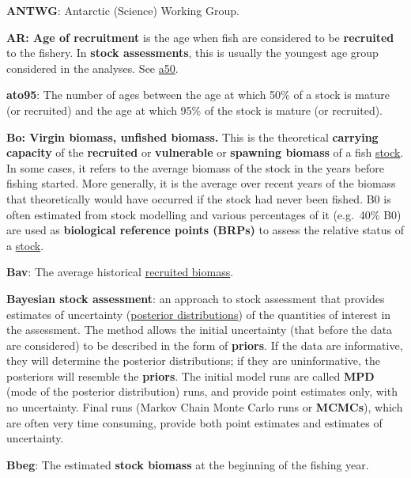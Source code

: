\documentclass{mpi-plenary}
\theoremstyle{definition}
\theoremstyle{definition}
\theoremstyle{definition}
\theoremstyle{remark}
\begin{document}
\protect\hypertarget{def-antwg}{}{} \textbf{ANTWG}: Antarctic (Science)
Working Group.

\protect\hypertarget{def-age-of-recruitment}{}{} \textbf{AR: Age of
recruitment} is the age when fish are considered to be
\textbf{recruited} to the fishery. In \textbf{stock assessments}, this
is usually the youngest age group considered in the analyses. See
\protect\hyperlink{def-a50}{a50}.

\protect\hypertarget{def-a-to-95}{}{} \textbf{ato95}: The number of ages
between the age at which 50\% of a stock is mature (or recruited) and
the age at which 95\% of the stock is mature (or recruited).

\protect\hypertarget{def-bo}{}{} \textbf{Bo: Virgin biomass, unfished
biomass.} This is the theoretical \textbf{carrying capacity} of the
\textbf{recruited} or \textbf{vulnerable} or \textbf{spawning biomass}
of a fish \protect\hyperlink{def-stock}{stock}. In some cases, it refers
to the average biomass of the stock in the years before fishing started.
More generally, it is the average over recent years of the biomass that
theoretically would have occurred if the stock had never been fished. B0
is often estimated from stock modelling and various percentages of it
(e.g.~40\% B0) are used as \textbf{biological reference points (BRPs)}
to assess the relative status of a \protect\hyperlink{def-stock}{stock}.

\protect\hypertarget{def-bav}{}{} \textbf{Bav}: The average historical
\protect\hyperlink{def-recruited-biomass}{recruited biomass}.

\protect\hypertarget{def-bayesian-stock-assessment}{}{} \textbf{Bayesian
stock assessment}: an approach to stock assessment that provides
estimates of uncertainty (\protect\hyperlink{def-posterior}{posterior
distributions}) of the quantities of interest in the assessment. The
method allows the initial uncertainty (that before the data are
considered) to be described in the form of \textbf{priors}. If the data
are informative, they will determine the posterior distributions; if
they are uninformative, the posteriors will resemble the
\textbf{priors}. The initial model runs are called \textbf{MPD} (mode of
the posterior distribution) runs, and provide point estimates only, with
no uncertainty. Final runs (Markov Chain Monte Carlo runs or
\textbf{MCMCs}), which are often very time consuming, provide both point
estimates and estimates of uncertainty.

\protect\hypertarget{def-bbeg}{}{} \textbf{Bbeg}: The estimated
\textbf{stock biomass} at the beginning of the fishing year.
\end{document}

